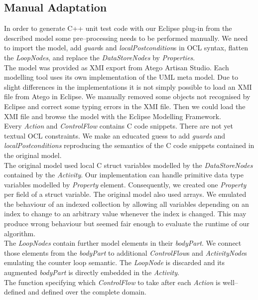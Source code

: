 \documentclass[runningheads,a4paper]{llncs}%
\newcommand{\UMLType}[1]{\textsf{\textit{#1}}} %
\newcommand{\UMLReference}[1]{\textsf{\textit{#1}}} %
\begin{document}
\subsection{Manual Adaptation}%
In order to generate C++ unit test code with our Eclipse plug-in from the described model some pre--processing needs to be performed manually. We need to import the model, add \UMLReference{guard}s and \UMLReference{localPostcondition}s in OCL syntax, flatten the \UMLType{LoopNodes}, and replace the \UMLType{DataStoreNodes} by \UMLType{Properties}.\\%
The model was provided as XMI export from Atego\textsuperscript{\textregistered} Artisan Studio. Each modelling tool uses its own implementation of the UML meta model. Due to slight differences in the implementations it is not simply possible to load an XMI file from Atego\textsuperscript{\textregistered} in Eclipse. We manually removed some objects not recognised by Eclipse and correct some typing errors in the XMI file. Then we could load the XMI file and browse the model with the Eclipse Modelling Framework.\\%
Every \UMLType{Action} and \UMLReference{ControlFlow} contains C code snippets. There are not yet textual OCL constraints. We make an educated guess to add \UMLReference{guards} and \UMLReference{localPostconditions} reproducing the semantics of the C code snippets contained in the original model.\\%
The original model used local C struct variables modelled by the \UMLType{DataStoreNodes} contained by the \UMLType{Activity}. Our implementation can handle primitive data type variables modelled by \UMLType{Property} element. Consequently, we created one \UMLType{Property} per field of a struct variable. The original model also used arrays. We emulated the behaviour of an indexed collection by allowing all variables depending on an index to change to an arbitrary value whenever the index is changed. This may produce wrong behaviour but seemed fair enough to evaluate the runtime of our algorithm.\\
The \UMLType{LoopNodes} contain further model elements in their \UMLReference{bodyPart}. We connect those elements from the \UMLReference{bodyPart} to additional \UMLType{ControlFlow}s and \UMLType{ActivityNode}s emulating the counter loop semantic. The \UMLType{LoopNode} is discarded and its augmented \UMLReference{bodyPart} is directly embedded in the \UMLType{Activity}.%
\\%
The function specifying which \UMLType{ControlFlow} to take after each \UMLType{Action} is well--defined and defined over the complete domain.%
\end{document}
